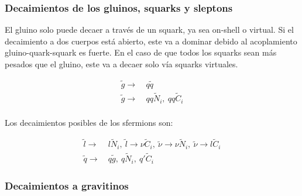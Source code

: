 \subsubsection{Decaimientos de los gluinos, squarks y sleptons}

El gluino solo puede decaer a través de un squark, ya sea on-shell o virtual. Si el decaimiento a
dos cuerpos está abierto, este va a dominar debido al acoplamiento gluino-quark-squark es fuerte.
En el caso de que todos los squarks sean más pesados que el gluino, este va a decaer solo vía
squarks virtuales.



\begin{equation}
	\begin{split}
		\tilde{g}\to &\ q\tilde{q} \\
		\tilde{g}\to &\ qq\tilde{N}_i,\ qq\tilde{C}_i \\
	\end{split}
	\label{eq:gluino_dec}
\end{equation}


Los decaimientos posibles de los sfermions son:

\begin{equation}
	\begin{split}
		\tilde{l}\to &\ l\tilde{N}_i,\ \tilde{l}\to \nu\tilde{C}_i,\ \tilde{\nu}\to \nu\tilde{N}_i,\ \tilde{\nu}\to l\tilde{C}_i \\
		\tilde{q}\to &\ q\tilde{g},\ q\tilde{N}_i,\ q'\tilde{C}_i
	\end{split}
\end{equation}

\subsubsection{Decaimientos a gravitinos}

